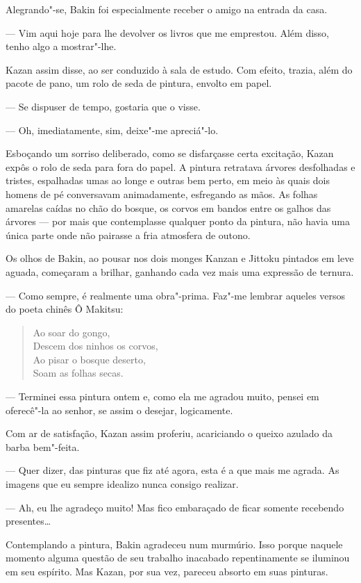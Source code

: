 Alegrando"-se, Bakin foi especialmente receber o amigo na entrada da casa.

--- Vim aqui hoje para lhe devolver os livros que me emprestou. Além
disso, tenho algo a mostrar"-lhe.

Kazan assim disse, ao ser conduzido à sala de estudo. Com efeito,
trazia, além do pacote de pano, um rolo de seda de pintura, envolto em
papel.

--- Se dispuser de tempo, gostaria que o visse.

--- Oh, imediatamente, sim, deixe"-me apreciá"-lo.

Esboçando um sorriso deliberado, como se disfarçasse certa excitação,
Kazan expôs o rolo de seda para fora do papel. A pintura retratava
árvores desfolhadas e tristes, espalhadas umas ao longe e outras bem
perto, em meio às quais dois homens de pé conversavam animadamente,
esfregando as mãos. As folhas amarelas caídas no chão do bosque, os
corvos em bandos entre os galhos das árvores --- por mais que
contemplasse qualquer ponto da pintura, não havia uma única parte onde
não pairasse a fria atmosfera de outono.

Os olhos de Bakin, ao pousar nos dois monges Kanzan e Jittoku pintados
em leve aguada, começaram a brilhar, ganhando cada vez mais uma
expressão de ternura.

--- Como sempre, é realmente uma obra"-prima. Faz"-me lembrar aqueles versos
do poeta chinês Ô Makitsu:

\begin{verse}
Ao soar do gongo,\\
Descem dos ninhos os corvos,\\
Ao pisar o bosque deserto,\\
Soam as folhas secas.
\end{verse}

\sectionitem
--- Terminei essa pintura ontem e, como ela me agradou muito, pensei em
oferecê"-la ao senhor, se assim o desejar, logicamente.

Com ar de satisfação, Kazan assim proferiu, acariciando o queixo azulado
da barba bem"-feita.

--- Quer dizer, das pinturas que fiz até agora, esta é a que mais me
agrada. As imagens que eu sempre idealizo nunca consigo realizar.

--- Ah, eu lhe agradeço muito! Mas fico embaraçado de ficar somente
recebendo presentes\ldots{}

Contemplando a pintura, Bakin agradeceu num murmúrio. Isso porque
naquele momento alguma questão de seu trabalho inacabado repentinamente
se iluminou em seu espírito. Mas Kazan, por sua vez, pareceu absorto em
suas pinturas.

